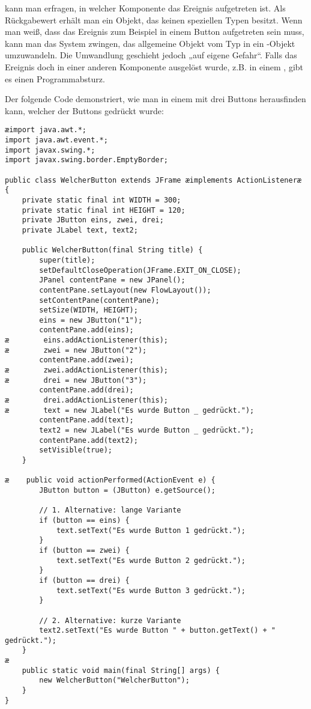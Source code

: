 kann man erfragen, in welcher Komponente das Ereignis aufgetreten ist. Als
Rückgabewert erhält man ein Objekt, das keinen speziellen Typen besitzt. Wenn
man weiß, dass das Ereignis zum Beispiel in einem Button aufgetreten sein muss,
kann man das System zwingen, das allgemeine Objekt vom Typ  in
ein -Objekt umzuwandeln. Die Umwandlung geschieht jedoch „auf
eigene Gefahr“. Falls das Ereignis doch in einer anderen Komponente ausgelöst
wurde, z.B. in einem , gibt es einen Programmabsturz.

Der folgende Code demonstriert, wie man in einem  mit drei
Buttons herausfinden kann, welcher der Buttons gedrückt wurde:

\begin{lstlisting}
æimport java.awt.*;
import java.awt.event.*;
import javax.swing.*;
import javax.swing.border.EmptyBorder;

public class WelcherButton extends JFrame æimplements ActionListeneræ {
    private static final int WIDTH = 300;
    private static final int HEIGHT = 120;
    private JButton eins, zwei, drei;
    private JLabel text, text2;

    public WelcherButton(final String title) {
        super(title);
        setDefaultCloseOperation(JFrame.EXIT_ON_CLOSE);
        JPanel contentPane = new JPanel();
        contentPane.setLayout(new FlowLayout());
        setContentPane(contentPane);
        setSize(WIDTH, HEIGHT);
        eins = new JButton("1");
        contentPane.add(eins);
æ        eins.addActionListener(this);
æ        zwei = new JButton("2");
        contentPane.add(zwei);
æ        zwei.addActionListener(this);
æ        drei = new JButton("3");
        contentPane.add(drei);
æ        drei.addActionListener(this);
æ        text = new JLabel("Es wurde Button _ gedrückt.");
        contentPane.add(text);
        text2 = new JLabel("Es wurde Button _ gedrückt.");
        contentPane.add(text2);
        setVisible(true);
    }

æ    public void actionPerformed(ActionEvent e) {
        JButton button = (JButton) e.getSource();

        // 1. Alternative: lange Variante
        if (button == eins) {
            text.setText("Es wurde Button 1 gedrückt.");
        }
        if (button == zwei) {
            text.setText("Es wurde Button 2 gedrückt.");
        }
        if (button == drei) {
            text.setText("Es wurde Button 3 gedrückt.");
        }

        // 2. Alternative: kurze Variante
        text2.setText("Es wurde Button " + button.getText() + " gedrückt.");
    }
æ
    public static void main(final String[] args) {
        new WelcherButton("WelcherButton");
    }
}
\end{lstlisting}


